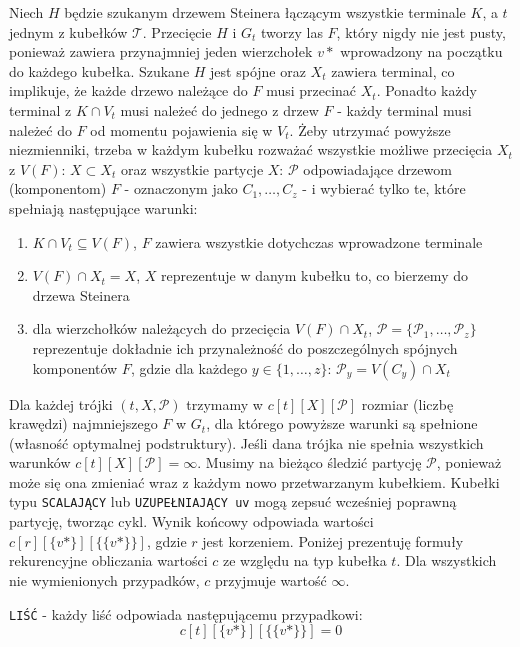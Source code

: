 \documentclass[12pt, oneside]{report}
\begin{document}
Niech $H$ będzie szukanym drzewem Steinera łączącym wszystkie terminale $K$, a $t$ jednym z kubełków $\mathcal{T}$. Przecięcie $H$ i $G_t$ tworzy las $F$, który nigdy nie jest pusty, ponieważ zawiera przynajmniej jeden wierzchołek $v*$ wprowadzony na początku do każdego kubełka. Szukane $H$ jest spójne oraz $X_t$ zawiera terminal, co implikuje, że każde drzewo należące do $F$ musi przecinać $X_t$. Ponadto każdy terminal z $K \cap V_t$ musi należeć do jednego z drzew $F$ - każdy terminal musi należeć do $F$ od momentu pojawienia się w $V_t$. Żeby utrzymać powyższe niezmienniki, trzeba w każdym kubełku rozważać wszystkie możliwe przecięcia $X_t$ z $V(F)$: $X \subset{X_t}$ oraz wszystkie partycje $X$: $\mathcal{P}$ odpowiadające drzewom (komponentom) $F$ - oznaczonym jako $C_1, \dots, C_z$ - i wybierać tylko te, które spełniają następujące warunki: 
\begin{enumerate}
\item{$K \cap V_t \subseteq V(F)$, $F$ zawiera wszystkie dotychczas wprowadzone terminale}
\item{$V(F) \cap X_t = X$, $X$ reprezentuje w danym kubełku to, co bierzemy do drzewa Steinera}
\item{dla wierzchołków należących do przecięcia $V(F) \cap X_t$, $\mathcal{P} = \{\mathcal{P}_1, \dots, \mathcal{P}_z\}$ reprezentuje dokładnie ich przynależność do poszczególnych spójnych komponentów $F$, gdzie dla każdego $y \in \{1, \dots, z\}$: $\mathcal{P}_y = V(C_y) \cap X_t$}
\end{enumerate}
Dla każdej trójki $(t, X, \mathcal{P})$ trzymamy w $c[t][X][\mathcal{P}]$ rozmiar (liczbę krawędzi) najmniejszego $F$ w $G_t$, dla którego powyższe warunki są spełnione (własność optymalnej podstruktury). Jeśli dana trójka nie spełnia wszystkich warunków $c[t][X][\mathcal{P}] = \infty$. Musimy na bieżąco śledzić partycję $\mathcal{P}$, ponieważ może się ona zmieniać wraz z każdym nowo przetwarzanym kubełkiem. Kubełki typu \texttt{SCALAJĄCY} lub \texttt{UZUPEŁNIAJĄCY uv} mogą zepsuć wcześniej poprawną partycję, tworząc cykl. Wynik końcowy odpowiada wartości $c[r][\{v*\}][\{\{v*\}\}]$, gdzie $r$ jest korzeniem. Poniżej prezentuję formuły rekurencyjne obliczania wartości $c$ ze względu na typ kubełka $t$. Dla wszystkich nie wymienionych przypadków, $c$ przyjmuje wartość $\infty$. \newline

\texttt{LIŚĆ} - każdy liść odpowiada następującemu przypadkowi:
$$c[t][\{v*\}][\{\{v*\}\}] = 0$$
\end{document}
